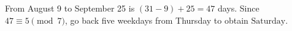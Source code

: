 From August 9 to September 25 is $(31-9)+25=47$ days. Since $47\equiv5\pmod7$, go back five weekdays from Thursday to obtain $\boxed{\text{Saturday}}$.
